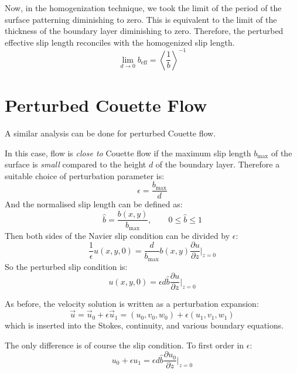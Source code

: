 \documentclass[a4paper]{report}
\newcommand{\beff}{\ensuremath{b_{\mathrm{eff}}}}
\newcommand{\bmax}{\ensuremath{b_{\mathrm{max}}}}
\begin{document}
Now, in the homogenization technique, we took the limit of the period of the surface patterning diminishing to zero.  This is equivalent to the limit of the thickness of the boundary layer diminishing to zero.  Therefore, the perturbed effective slip length reconciles with the homogenized slip length.
\begin{equation}
\lim_{d \to 0} \beff = \left< \frac{1}{b} \right>^{-1}
\end{equation}

\section*{Perturbed Couette Flow}

A similar analysis can be done for perturbed Couette flow.

In this case, flow is \emph{close to} Couette flow if the maximum slip length $\bmax$ of the surface is \emph{small} compared to the height $d$ of the boundary layer.  Therefore a suitable choice of perturbation parameter is:
\begin{equation}
\epsilon = \frac{\bmax}{d}
\end{equation} 
And the normalised slip length can be defined as:
\begin{equation}
\hat{b} = \frac{b(x,y)}{\bmax}, \qquad 0 \leq \hat{b} \leq 1
\end{equation}
Then both sides of the Navier slip condition can be divided by $\epsilon$:
\begin{equation}
\frac{1}{\epsilon} u(x,y,0) = \frac{d}{\bmax} b(x,y) \frac{\partial u}{\partial z} \rvert_{z=0}
\end{equation}
So the perturbed slip condition is:
\begin{equation}
u(x,y,0) = \epsilon d \hat{b} \frac{\partial u}{\partial z} \rvert_{z=0}
\end{equation}

As before, the velocity solution is written as a perturbation expansion:
\begin{equation}
\vec{u} = \vec{u}_0 + \epsilon \vec{u}_1 = (u_0, v_0, w_0) + \epsilon(u_1, v_1, w_1)
\end{equation}
which is inserted into the Stokes, continuity, and various boundary equations.

The only difference is of course the slip condition.  To first order in $\epsilon$:
\begin{equation}
u_0 + \epsilon u_1 = \epsilon d \hat{b} \frac{\partial u_0}{\partial z} \rvert_{z=0}
\end{equation}
\end{document}
